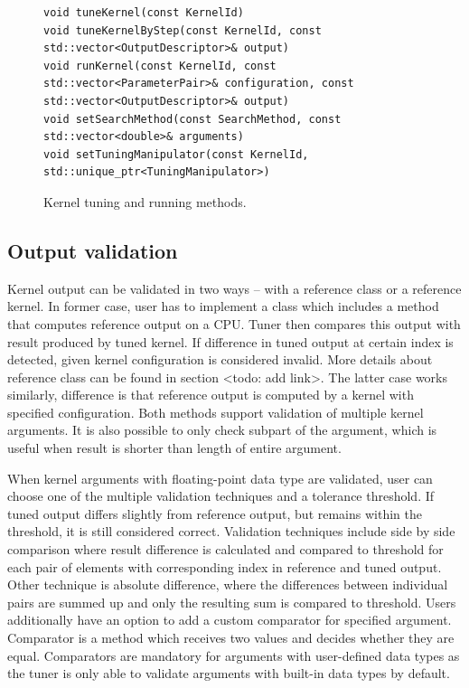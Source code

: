 \documentclass
[
    digital, %
    oneside, %
    table, %
    nolof, %
    nolot, %
    nocover %
]{fithesis3}
\begin{document}
\begin{figure}
\begin{lstlisting}
void tuneKernel(const KernelId)
void tuneKernelByStep(const KernelId, const std::vector<OutputDescriptor>& output)
void runKernel(const KernelId, const std::vector<ParameterPair>& configuration, const std::vector<OutputDescriptor>& output)
void setSearchMethod(const SearchMethod, const std::vector<double>& arguments)
void setTuningManipulator(const KernelId, std::unique_ptr<TuningManipulator>)
\end{lstlisting}
\caption{Kernel tuning and running methods.}
\label{ktt-tuning-methods}
\end{figure}

\subsection{Output validation}
Kernel output can be validated in two ways -- with a reference class or a reference kernel. In former case, user has to implement a class which
includes a method that computes reference output on a CPU. Tuner then compares this output with result produced by tuned kernel. If difference in tuned
output at certain index is detected, given kernel configuration is considered invalid. More details about reference class can be found in section <todo: add link>.
The latter case works similarly, difference is that reference output is computed by a kernel with specified configuration. Both methods support
validation of multiple kernel arguments. It is also possible to only check subpart of the argument, which is useful when result is shorter than length
of entire argument.

When kernel arguments with floating-point data type are validated, user can choose one of the multiple validation techniques and a tolerance threshold.
If tuned output differs slightly from reference output, but remains within the threshold, it is still considered correct. Validation techniques include
side by side comparison where result difference is calculated and compared to threshold for each pair of elements with corresponding index in reference
and tuned output. Other technique is absolute difference, where the differences between individual pairs are summed up and only the resulting sum is
compared to threshold. Users additionally have an option to add a custom comparator for specified argument. Comparator is a method which receives two
values and decides whether they are equal. Comparators are mandatory for arguments with user-defined data types as the tuner is only able to validate
arguments with built-in data types by default.
\end{document}
